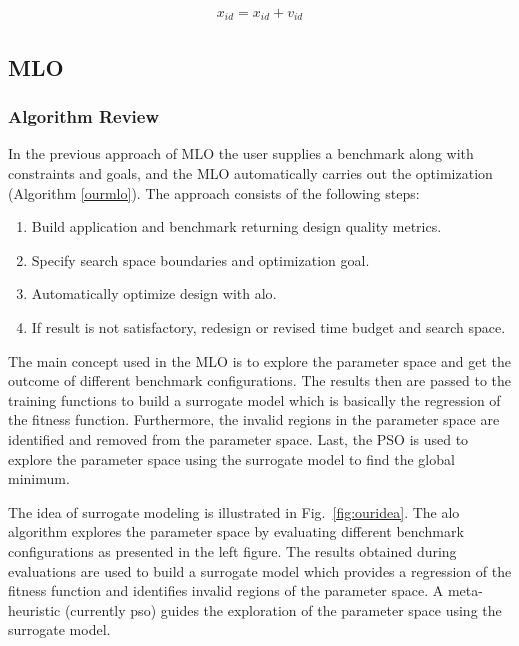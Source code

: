 \documentclass[12pt, runningheads,a4paper]{llncs}
\begin{document}
\begin{align} 
\label{eq:pso2}
x_{id}=x_{id}+v_{id} 
\end{align}


\subsection{MLO}
\subsubsection{Algorithm Review}

In the previous approach of MLO the user supplies a benchmark along with constraints and goals, and the MLO automatically carries out the optimization (Algorithm \ref{ourmlo}). The approach consists of the following steps:

\begin{enumerate}\addtolength{\itemsep}{-0.1\baselineskip}  
\item Build application and benchmark returning design quality metrics.
\item Specify search space boundaries and optimization goal.
\item Automatically optimize design with \ac{alo}.
\item If result is not satisfactory, redesign or revised time budget and search space.

\end{enumerate}
The main concept used in the MLO \cite{arc2012MLO} is to explore the parameter space and get the outcome of different benchmark configurations. The results then are passed to the training functions to build a surrogate model which is basically the regression of the fitness function. Furthermore, the invalid regions in the parameter space are identified and removed from the parameter space. Last, the PSO is used to explore the parameter space using the surrogate model to find the global minimum.

The idea of surrogate modeling is illustrated in Fig.~\ref{fig:ouridea}. The \ac{alo} algorithm explores the parameter space by evaluating different benchmark configurations as presented in the left figure. The results obtained during evaluations are used to build a surrogate model which provides a regression of the fitness function and identifies invalid regions of the parameter space. A meta-heuristic (currently \ac{pso}) guides the exploration of the parameter space using the surrogate model. 
\end{document}
